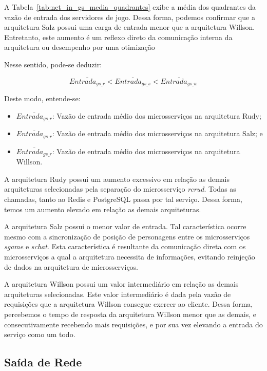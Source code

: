 A Tabela~\ref{tab:net_in_gs_media_quadrantes} exibe a média dos quadrantes da vazão de entrada dos servidores de jogo.
%
Dessa forma, podemos confirmar que a arquitetura Salz possui uma carga de entrada menor que a arquitetura Willson.
%
Entretanto, este aumento é um reflexo direto da comunicação interna da arquitetura ou desempenho por uma otimização

Nesse sentido, pode-se deduzir:

$$
    \overline{Entrada_{gs\_r}} < \overline{Entrada_{gs\_s}} < \overline{Entrada_{gs\_w}}
$$

Deste modo, entende-se:

\begin{itemize}
 \item $\overline{Entrada_{gs\_r}}$: Vazão de entrada médio dos microsserviços na arquitetura Rudy;
 \item $\overline{Entrada_{gs\_r}}$: Vazão de entrada médio dos microsserviços na arquitetura Salz; e
 \item $\overline{Entrada_{gs\_r}}$: Vazão de entrada médio dos microsserviços na arquitetura Willson.
\end{itemize}

A arquitetura Rudy possui um aumento excessivo em relação as demais arquiteturas selecionadas pela separação do microsserviço \textit{rcrud}.
%
Todas as chamadas, tanto ao Redis e PostgreSQL passa por tal serviço.
%
Dessa forma, temos um aumento elevado em relação as demais arquiteturas.

A arquitetura Salz possui o menor valor de entrada.
%
Tal característica ocorre mesmo com a sincronização de posição de personagens entre os microsserviços \textit{sgame} e \textit{schat}.
%
Esta característica é resultante da comunicação direta com os microsserviços a qual a arquitetura necessita de informações, evitando reinjeção de dados na arquitetura de microsserviços.

A arquitetura Willson possui um valor intermediário em relação as demais arquiteturas selecionadas.
%
Este valor intermediário é dada pela vazão de requisições que a arquitetura Willson consegue exercer ao cliente.
%
Dessa forma, percebemos o tempo de resposta da arquitetura Willson menor que as demais, e consecutivamente recebendo mais requisições, e por sua vez elevando a entrada do serviço como um todo.

\subsection{Saída de Rede}

